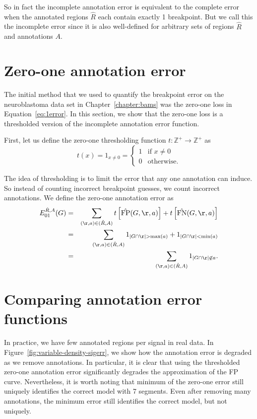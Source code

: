 \documentclass{article}
\begin{document}
So in fact the incomplete annotation error is equivalent to the
complete error when the annotated regions $\hat R$ each contain
exactly 1 breakpoint. But we call this the incomplete error since it
is also well-defined for arbitrary sets of regions $\hat R$ and
annotations $A$.

\section{Zero-one annotation error}
\label{sec:zero-one}
The initial method that we used to quantify the breakpoint error on
the neuroblastoma data set in Chapter~\ref{chapter:bams} was the
zero-one loss in Equation~\ref{eq:1error}. In this section, we show
that the zero-one loss is a thresholded version of the incomplete
annotation error function.

First, let us define the zero-one thresholding function
$t:\mathbb Z^+\rightarrow\mathbb Z^+$ as
\begin{equation}
  \label{eq:thresholding}
  t(x)=1_{x\neq 0} =
  \begin{cases}
    1 & \text{if }x\neq 0\\
    0 & \text{otherwise}.
  \end{cases}
\end{equation}

The idea of thresholding is to limit the error that any one annotation
can induce. So instead of counting incorrect breakpoint guesses, we count
incorrect annotations. We define the zero-one annotation error as
\begin{eqnarray}
  \label{eq:ann01err}
  E_{01}^{\hat R,A}(G)
&=&\nonumber
 \sum_{(\r,a)\in(\hat R,A)} 
t\left[\hat{\text{FP}}(G,\r,a)\right]+
t\left[\hat{\text{FN}}(G,\r,a)\right]\\
&=&\nonumber
 \sum_{(\r,a)\in(\hat R,A)} 
1_{|G\cap\r|>\max(a)}+
1_{|G\cap \r|<\min(a)}\\
&=&
 \sum_{(\r,a)\in(\hat R,A)} 
1_{|G\cap\r|\not\in a}.
\end{eqnarray}

\newpage 

\section{Comparing annotation error functions}

In practice, we have few annotated regions per signal in real data. In
Figure~\ref{fig:variable-density-sigerr}, we show how the annotation
error is degraded as we remove annotations. In particular, it is clear
that using the thresholded zero-one annotation error significantly
degrades the approximation of the FP curve. Nevertheless, it is worth
noting that minimum of the zero-one error still uniquely identifies
the correct model with 7 segments. Even after removing many
annotations, the minimum error still identifies the correct
model, but not uniquely.
\end{document}
